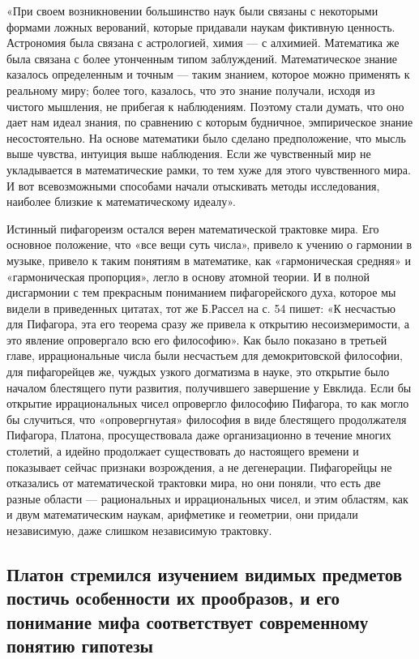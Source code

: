 «При своем возникновении большинство наук были связаны с некоторыми
формами ложных верований, которые придавали наукам фиктивную ценность.
Астрономия была связана с астрологией, химия --- с алхимией.
Математика же была связана с более утонченным типом заблуждений.
Математическое знание казалось определенным и точным --- таким
знанием, которое можно применять к реальному миру; более того,
казалось, что это знание получали, исходя из чистого мышления, не
прибегая к наблюдениям. Поэтому стали думать, что оно дает нам идеал
знания, по сравнению с которым будничное, эмпирическое знание
несостоятельно. На основе математики было сделано предположение, что
мысль выше чувства, интуиция выше наблюдения. Если же чувственный мир
не укладывается в математические рамки, то тем хуже для этого
чувственного мира. И вот всевозможными способами начали отыскивать
методы исследования, наиболее близкие к математическому идеалу».

Истинный пифагореизм остался верен математической трактовке мира. Его
основное положение, что «все вещи суть числа», привело к учению о
гармонии в музыке, привело к таким понятиям в математике, как
«гармоническая средняя» и «гармоническая пропорция», легло в основу
атомной теории. И в полной дисгармонии с тем прекрасным пониманием
пифагорейского духа, которое мы видели в приведенных цитатах, тот же
Б.Рассел на с. 54 пишет: «К несчастью для Пифагора, эта его теорема
сразу же привела к открытию несоизмеримости, а это явление опровергало
всю его философию». Как было показано в третьей главе, иррациональные
числа были несчастьем для демокритовской философии, для пифагорейцев
же, чуждых узкого догматизма в науке, это открытие было началом
блестящего пути развития, получившего завершение у Евклида. Если бы
открытие иррациональных чисел опровергло философию Пифагора, то как
могло бы случиться, что «опровергнутая» философия в виде блестящего
продолжателя Пифагора, Платона, просуществовала даже организационно в
течение многих столетий, а идейно продолжает существовать до
настоящего времени и показывает сейчас признаки возрождения, а не
дегенерации. Пифагорейцы не отказались от математической трактовки
мира, но они поняли, что есть две разные области --- рациональных и
иррациональных чисел, и этим областям, как и двум математическим
наукам, арифметике и геометрии, они придали независимую, даже слишком
независимую трактовку.

\subsection{Платон стремился изучением видимых предметов постичь
особенности их прообразов, и его понимание мифа соответствует
современному понятию гипотезы}

